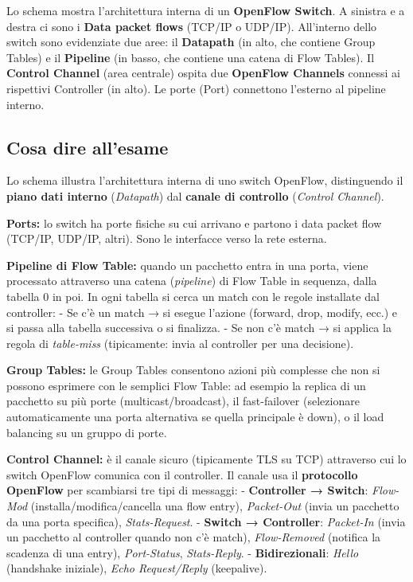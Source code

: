 \documentclass[
  italian,
  openany]{book}
\begin{document}
Lo schema mostra l'architettura interna di un \textbf{OpenFlow Switch}.
A sinistra e a destra ci sono i \textbf{Data packet flows} (TCP/IP o
UDP/IP). All'interno dello switch sono evidenziate due aree: il
\textbf{Datapath} (in alto, che contiene Group Tables) e il
\textbf{Pipeline} (in basso, che contiene una catena di Flow Tables). Il
\textbf{Control Channel} (area centrale) ospita due \textbf{OpenFlow
Channels} connessi ai rispettivi Controller (in alto). Le porte (Port)
connettono l'esterno al pipeline interno.

\subsection{Cosa dire all'esame}\label{cosa-dire-allesame-9}

Lo schema illustra l'architettura interna di uno switch OpenFlow,
distinguendo il \textbf{piano dati interno} (\emph{Datapath}) dal
\textbf{canale di controllo} (\emph{Control Channel}).

\textbf{Ports:} lo switch ha porte fisiche su cui arrivano e partono i
data packet flow (TCP/IP, UDP/IP, altri). Sono le interfacce verso la
rete esterna.

\textbf{Pipeline di Flow Table:} quando un pacchetto entra in una porta,
viene processato attraverso una catena (\emph{pipeline}) di Flow Table
in sequenza, dalla tabella 0 in poi. In ogni tabella si cerca un match
con le regole installate dal controller: - Se c'è un match → si esegue
l'azione (forward, drop, modify, ecc.) e si passa alla tabella
successiva o si finalizza. - Se non c'è match → si applica la regola di
\emph{table-miss} (tipicamente: invia al controller per una decisione).

\textbf{Group Tables:} le Group Tables consentono azioni più complesse
che non si possono esprimere con le semplici Flow Table: ad esempio la
replica di un pacchetto su più porte (multicast/broadcast), il
fast-failover (selezionare automaticamente una porta alternativa se
quella principale è down), o il load balancing su un gruppo di porte.

\textbf{Control Channel:} è il canale sicuro (tipicamente TLS su TCP)
attraverso cui lo switch OpenFlow comunica con il controller. Il canale
usa il \textbf{protocollo OpenFlow} per scambiarsi tre tipi di messaggi:
- \textbf{Controller → Switch}: \emph{Flow-Mod}
(installa/modifica/cancella una flow entry), \emph{Packet-Out} (invia un
pacchetto da una porta specifica), \emph{Stats-Request}. -
\textbf{Switch → Controller}: \emph{Packet-In} (invia un pacchetto al
controller quando non c'è match), \emph{Flow-Removed} (notifica la
scadenza di una entry), \emph{Port-Status}, \emph{Stats-Reply}. -
\textbf{Bidirezionali}: \emph{Hello} (handshake iniziale), \emph{Echo
Request/Reply} (keepalive).
\end{document}
